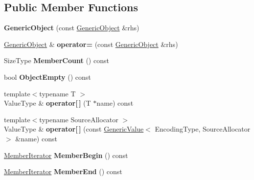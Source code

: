 \subsection*{Public Member Functions}
\begin{DoxyCompactItemize}
\item 
\mbox{\label{classGenericObject_a10173c42d0e8a71ca0e3ae75d800887a}} 
{\bfseries Generic\+Object} (const \hyperlink{classGenericObject}{Generic\+Object} \&rhs)
\item 
\mbox{\label{classGenericObject_af8984f76d6f3b13039c6d3b8e217f747}} 
\hyperlink{classGenericObject}{Generic\+Object} \& {\bfseries operator=} (const \hyperlink{classGenericObject}{Generic\+Object} \&rhs)
\item 
\mbox{\label{classGenericObject_a15326564c82f2b545811f753534563e4}} 
Size\+Type {\bfseries Member\+Count} () const
\item 
\mbox{\label{classGenericObject_a9cc10bfeeb6a5eb95ba1ae587b6e6ad8}} 
bool {\bfseries Object\+Empty} () const
\item 
\mbox{\label{classGenericObject_a2d8c758d10e7c7ab23e3904d5936b204}} 
{\footnotesize template$<$typename T $>$ }\\Value\+Type \& {\bfseries operator\mbox{[}$\,$\mbox{]}} (T $\ast$name) const
\item 
\mbox{\label{classGenericObject_a19bfc1bd98b120d42e7d50db0886614a}} 
{\footnotesize template$<$typename Source\+Allocator $>$ }\\Value\+Type \& {\bfseries operator\mbox{[}$\,$\mbox{]}} (const \hyperlink{classGenericValue}{Generic\+Value}$<$ Encoding\+Type, Source\+Allocator $>$ \&name) const
\item 
\mbox{\label{classGenericObject_af1e80a8a521f05530f9b6a448242ff2d}} 
\hyperlink{classGenericMemberIterator}{Member\+Iterator} {\bfseries Member\+Begin} () const
\item 
\mbox{\label{classGenericObject_a75873786614f67796bfb190008e004dc}} 
\hyperlink{classGenericMemberIterator}{Member\+Iterator} {\bfseries Member\+End} () const

\end{DoxyCompactItemize}
